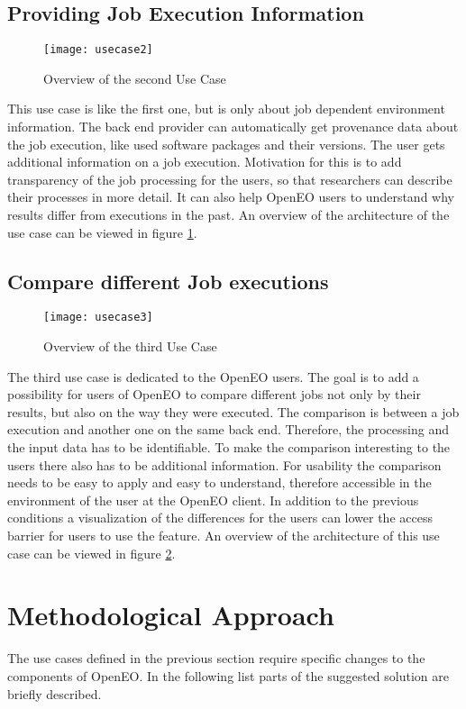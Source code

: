 \documentclass[draft,final]{vutinfth} %
\begin{document}
\subsection{Providing Job Execution Information}\label{UseCase2}
\begin{figure}[h]
	\centering
	\texttt{[image: usecase2]}
	\caption{Overview of the second Use Case}
	\label{fig:usecase2} %
\end{figure}
This use case is like the first one, but is only about job dependent environment information. The back end provider can automatically get provenance data about the job execution, like used software packages and their versions. The user gets additional information on a job execution. Motivation for this is to add transparency of the job processing for the users, so that researchers can describe their processes in more detail. It can also help OpenEO users to understand why results differ from executions in the past. An overview of the architecture of the use case can be viewed in figure \ref{fig:usecase2}. 
\subsection{Compare different Job executions}\label{UseCase3}
\begin{figure}[h]
	\centering
	\texttt{[image: usecase3]}
	\caption{Overview of the third Use Case}
	\label{fig:usecase3} %
\end{figure}
The third use case is dedicated to the OpenEO users. The goal is to add a possibility for users of OpenEO to compare different jobs not only by their results, but also on the way they were executed. The comparison is between a job execution and another one on the same back end. Therefore, the processing and the input data has to be identifiable. To make the comparison interesting to the users there also has to be additional information. For usability the comparison needs to be easy to apply and easy to understand, therefore accessible in the environment of the user at the OpenEO client. In addition to the previous conditions a visualization of the differences for the users can lower the access barrier for users to use the feature. An overview of the architecture of this use case can be viewed in figure \ref{fig:usecase3}.

\section{Methodological Approach}\label{Method}
The use cases defined in the previous section require specific changes to the components of OpenEO. In the following list parts of the suggested solution are briefly described. 
\end{document}
